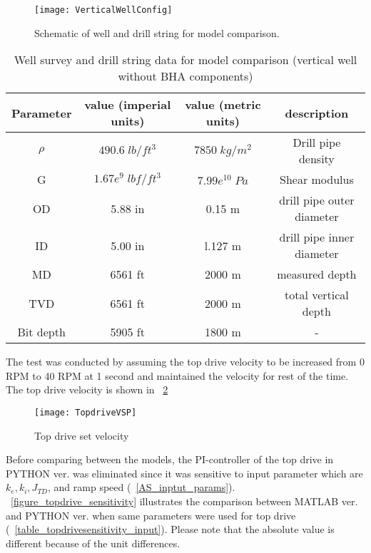 \begin{figure}[!hbt]
  \centering
  \texttt{[image: VerticalWellConfig]}
  \caption[Schematic of well and drill string for model comparison.]{Schematic of well and drill string for model comparison.}\label{figure_verticalwell}
\end{figure}

\begin{table}[!hbt]
\centering
\begin{tabular}{|c|c|c|c|}
\hline
Parameter & value (imperial units) & value (metric units) & description\\                                                              
\hline
$\rho$ & $490.6\;lb/ft^3$ & $7850\;kg/m^2$ & Drill pipe density \\                                                  
\hline
G & $1.67e^9\;lbf/ft^3$ & $7.99e^{10}\;Pa$  & Shear modulus \\                                                  
\hline
OD & 5.88 in & 0.15 m & drill pipe outer diameter\\                                                       
\hline
ID & 5.00 in & l.127 m & drill pipe inner diameter  \\                                                      
\hline
MD & 6561 ft & 2000 m & measured depth\\                                                              
\hline
TVD & 6561 ft & 2000 m & total vertical depth\\
\hline
Bit depth & 5905 ft & 1800 m & - \\ 
\hline
\end{tabular}
\caption[Well survey data for model comparison (vertical well)]{Well survey and drill string data for model comparison (vertical well without BHA components)}\label{table_verticalwell_input}
\end{table}
The test was conducted by assuming the top drive velocity to be increased from 0 RPM to 40 RPM at 1 second and maintained the velocity for rest of the time. The top drive velocity is shown in \figurename~\ref{figure_topdrive_VSP}

\begin{figure}[!hbt]
  \centering
  \texttt{[image: TopdriveVSP]}
  \caption[Top drive set velocity]{Top drive set velocity}\label{figure_topdrive_VSP}
\end{figure}

Before comparing between the models, the PI-controller of the top drive in PYTHON ver. was eliminated since it was sensitive to input parameter which are $k_e, k_i, J_{TD}$, and ramp speed (\tablename~\ref{AS_inptut_params}). \figurename~\ref{figure_topdrive_sensitivity} illustrates the comparison between MATLAB ver. and PYTHON ver. when same parameters were used for top drive (\tablename~\ref{table_topdrivesensitivity_input}). Please note that the absolute value is different because of the unit differences.

